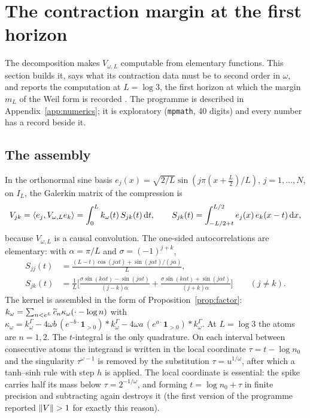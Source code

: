 \section{The contraction margin at the first horizon}\label{sec:contraction}

The decomposition makes $V_{\omega,L}$ computable from elementary functions.
This section builds it, says what its contraction data must be to second order
in $\omega$, and reports the computation at $L=\log3$, the first horizon at
which the margin $m_L$ of the Weil form is recorded \cite{CriticalPath}. The
programme is described in Appendix~\ref{app:numerics}; it is exploratory
(\texttt{mpmath}, 40 digits) and every number has a record beside it.

\subsection{The assembly}\label{sec:assembly}

In the orthonormal sine basis $e_j(x)=\sqrt{2/L}\sin(j\pi(x+\frac L2)/L)$,
$j=1,\dots,N$, on $I_L$, the Galerkin matrix of the compression is
\begin{equation}\label{eq:galerkin}
 V_{jk}=\langle e_j,V_{\omega,L}e_k\rangle=\int_0^Lk_\omega(t)\,S_{jk}(t)\,\mathrm d t,\qquad
 S_{jk}(t)=\int_{-L/2+t}^{L/2}e_j(x)\,e_k(x-t)\,\mathrm d x ,
\end{equation}
because $V_{\omega,L}$ is a causal convolution. The one-sided autocorrelations
are elementary: with $\alpha=\pi/L$ and $\sigma=(-1)^{j+k}$,
\begin{equation}\label{eq:S}
\begin{aligned}
 S_{jj}(t)&=\frac{(L-t)\cos(j\alpha t)+\sin(j\alpha t)/(j\alpha)}L,\\
 S_{jk}(t)&=\frac1L\Big[\frac{\sigma\sin(k\alpha t)-\sin(j\alpha t)}{(j-k)\alpha}
 +\frac{\sigma\sin(k\alpha t)+\sin(j\alpha t)}{(j+k)\alpha}\Big]\qquad(j\neq k).
\end{aligned}
\end{equation}
The kernel is assembled in the form of Proposition~\ref{prop:factor}:
$k_\omega=\sum_{n<e^L}\widetilde c_n\kappa_\omega(\cdot-\log n)$ with
$\kappa_\omega=k^\Gamma_\omega-4\omega b\,(e^{-b\cdot}\mathbf 1_{>0})*k^\Gamma_\omega-4\omega a\,(e^{a\cdot}\mathbf 1_{>0})*k^\Gamma_\omega$.
At $L=\log3$ the atoms are $n=1,2$. The $t$-integral is the only quadrature.
On each interval between consecutive atoms the integrand is written in the
local coordinate $\tau=t-\log n_0$ and the singularity $\tau^{\omega-1}$ is
removed by the substitution $\tau=u^{1/\omega}$, after which a tanh--sinh rule
with step $h$ is applied. The local coordinate is essential: the spike carries
half its mass below $\tau=2^{-1/\omega}$, and forming $t=\log n_0+\tau$ in
finite precision and subtracting again destroys it (the first version of the
programme reported $\lVert V\rVert>1$ for exactly this reason).

